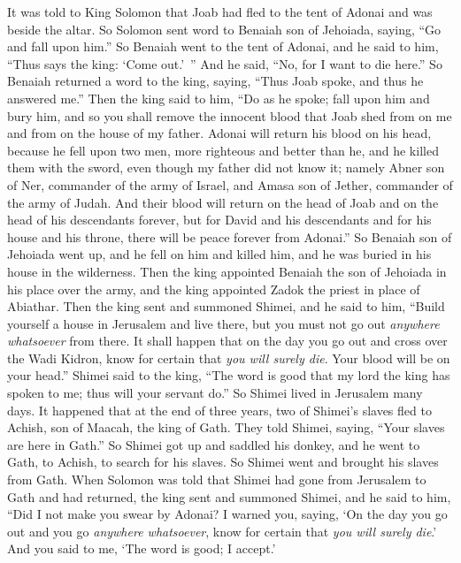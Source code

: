 \begin{biblechapter}
\verse It was told to King Solomon that Joab had fled to the tent of Adonai and was beside the altar. So Solomon sent word to Benaiah son of Jehoiada, saying, “Go and fall upon him.”
\verse So Benaiah went to the tent of Adonai, and he said to him, “Thus says the king: ‘Come out.’ ” And he said, “No, for I want to die here.” So Benaiah returned a word to the king, saying, “Thus Joab spoke, and thus he answered me.”
\verse Then the king said to him, “Do as he spoke; fall upon him and bury him, and so you shall remove the innocent blood that Joab shed from on me and from on the house of my father.
\verse Adonai will return his blood on his head, because he fell upon two men, more righteous and better than he, and he killed them with the sword, even though my father did not know it; namely Abner son of Ner, commander of the army of Israel, and Amasa son of Jether, commander of the army of Judah.
\verse And their blood will return on the head of Joab and on the head of his descendants forever, but for David and his descendants and for his house and his throne, there will be peace forever from Adonai.”
\verse So Benaiah son of Jehoiada went up, and he fell on him and killed him, and he was buried in his house in the wilderness.
\verse Then the king appointed Benaiah the son of Jehoiada in his place over the army, and the king appointed Zadok the priest in place of Abiathar.
\verse Then the king sent and summoned Shimei, and he said to him, “Build yourself a house in Jerusalem and live there, but you must not go out \textit{anywhere whatsoever} from there.
\verse It shall happen that on the day you go out and cross over the Wadi Kidron, know for certain that \textit{you will surely die}. Your blood will be on your head.”
\verse Shimei said to the king, “The word is good that my lord the king has spoken to me; thus will your servant do.” So Shimei lived in Jerusalem many days.
\verse It happened that at the end of three years, two of Shimei’s slaves fled to Achish, son of Maacah, the king of Gath. They told Shimei, saying, “Your slaves are here in Gath.”
\verse So Shimei got up and saddled his donkey, and he went to Gath, to Achish, to search for his slaves. So Shimei went and brought his slaves from Gath.
\verse When Solomon was told that Shimei had gone from Jerusalem to Gath and had returned,
\verse the king sent and summoned Shimei, and he said to him, “Did I not make you swear by Adonai? I warned you, saying, ‘On the day you go out and you go \textit{anywhere whatsoever}, know for certain that \textit{you will surely die}.’ And you said to me, ‘The word is good; I accept.’

\end{biblechapter}
